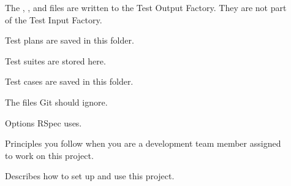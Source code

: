\begin{description}
  \item[\tfLog] The \logDebug, \logError, and \logInfo files are written to the
    Test Output Factory. They are not part of the Test Input Factory.

  \item[\tfPlan] Test plans are saved in this folder.

  \item[\tfSuite] Test suites are stored here.

  \item[\tfCase] Test cases are saved in this folder.

  \item[\pfIgnore] The files Git should ignore.

  \item[\pfRspec] Options RSpec uses.

  \item[\pfCOC] Principles you follow when you are a development team member
    assigned to work on this project.

  \item[\pfRead] Describes how to set up and use this project.

\end{description}
